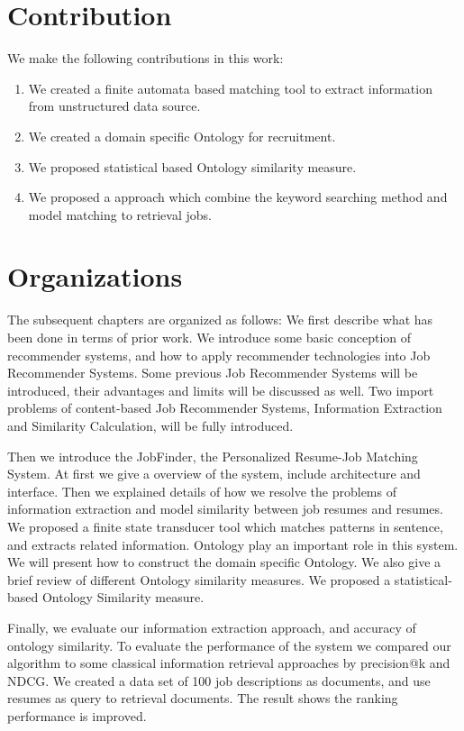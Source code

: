 \section{Contribution}

We make the following contributions in this work:

\begin{enumerate}
    \item  We created a finite automata based matching tool to extract information from unstructured data source.
    \item  We created a domain specific Ontology for recruitment.
    \item  We proposed statistical based Ontology similarity measure.
    \item  We proposed a approach which combine the keyword searching method and model matching to retrieval jobs.
\end{enumerate}

\section{Organizations}
The subsequent chapters are organized as follows: We first describe what has been done in terms of prior work.  We introduce some basic conception of recommender systems, and how to apply recommender technologies into Job Recommender Systems. Some previous Job Recommender Systems will be introduced,  their advantages and limits will be discussed as well.  Two import problems of content-based Job Recommender Systems, Information Extraction and Similarity Calculation, will be fully introduced.

Then we introduce the JobFinder, the Personalized Resume-Job Matching System. At first we give a overview of the system, include architecture and interface. Then we explained details of how we resolve the problems of information extraction and model similarity between job resumes and resumes. We proposed a finite state transducer tool which matches patterns in sentence, and extracts related information. Ontology play an important role in this system. We will present how to construct the domain specific Ontology. We also give a brief review of different Ontology similarity measures. We proposed a statistical-based Ontology Similarity measure. 

Finally, we evaluate our information extraction approach, and accuracy of ontology similarity. To evaluate the performance of the system  we compared our algorithm to some classical information retrieval approaches by precision@k and NDCG. We created a data set of 100 job descriptions as documents, and use resumes as query to retrieval documents. The result shows the ranking performance is improved. 
